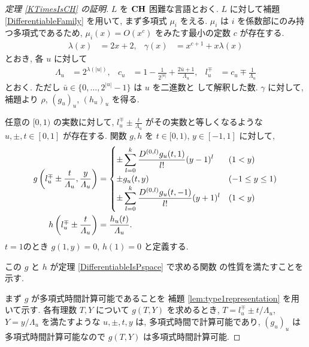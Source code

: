 \begin{proof}[\rm 定理 \ref{KTimesIsCH} の証明]
 $L$ を $\mathbf{CH}$ 困難な言語とおく.
 $L$ に対して補題 \ref{DifferentiableFamily} を用いて,
 まず多項式 $\mu_i$ をえる.
 $\mu_i$ は $i$ を係数部にのみ持つ多項式であるため,
 $\mu_i(x) = O(x^c)$ をみたす最小の定数 $c$ が存在する.
 \begin{align}
  \lambda(x) &= 2x + 2,&
  \gamma(x) &= x^{c+1} + x \lambda(x)
 \end{align}
 とおき, 各 $u$ に対して 
\begin{align}
 \Lambda_u 
 &= 2^{\lambda(|u|)}, &
 c_u 
 &= 1-\frac{1}{2^{|u|}}+\frac{2\bar{u}+1}{\Lambda_u}, &
 l_u^\mp 
 &= c_u\mp\frac{1}{\varLambda_u} 
\end{align}  
 とおく. ただし $\bar u \in \{0, \dots, 2^{|u|} - 1\}$ は $u$ を二進数と
 して解釈した数.
 $\gamma$ に対して, 補題より $\rho$, $(g_u)_u$, $(h_u)_u$ を得る.


 任意の $[0,1)$ の実数に対して,
 $l^\mp_u \pm \frac{t}{\Lambda_u}$ がその実数と等しくなるような
 $u, \pm, t\in [0,1]$ が存在する.
 関数 $g, h$ を $t \in [0,1)$, $y \in [-1, 1]$ に対して,
 \begin{align}
 g \left(l^\mp_u \pm \frac{t}{\varLambda_u}, \frac{y}{\varLambda_u}\right)
  &= \begin{cases}
      \pm \displaystyle \sum_{l=0}^k \frac{D^{(0,l)}g_u(t,1)}{l!} (y-1)^l 
      &  (1<y) \\
      \pm g_u(t, y)      & (-1 \le y \le 1) \\
      \pm \displaystyle \sum_{l=0}^k \frac{D^{(0,l)}g_u(t,-1)}{l!} (y+1)^l  
      &  (1<y) \\
    \end{cases} 
  \\
 h \left( l^\mp_u \pm \frac{t}{\varLambda_u} \right) 
  & = \frac{h_u(t)}{\varLambda_u}.
\end{align}
 $t=1$のとき $g(1,y) = 0$, $h(1) = 0$ と定義する.


 この $g$ と $h$ が定理 \ref{DifferentiableIsPspace} で求める関数
 の性質を満たすことを示す.


 
 まず $g$ が多項式時間計算可能であることを
 補題 \ref{lem:type1representation} を用いて示す.
 各有理数 $T,Y$ について $g(T, Y)$ を求めるとき,
 $T=l_u^\mp \pm t/\Lambda_u$, $Y = y/\Lambda_u$ を満たすような
 $u, \pm, t, y$ は, 多項式時間で計算可能であり,
 $(g_u)_u$ は多項式時間計算可能なので $g(T, Y)$ は多項式時間計算可能.



\end{proof}
